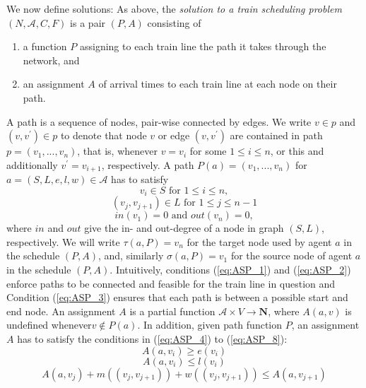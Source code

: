 \documentclass{article}
\begin{document}
We now define solutions:
As above, the \emph{solution to a train scheduling problem} $(N, \mathcal{A}, C, F)$ is a pair $(P,A)$ consisting of
\begin{enumerate}
    \item a function $P$ assigning to each train line the path it takes through the network, and
    \item an assignment $A$ of arrival times to each train line at each node on their path.
\end{enumerate}
A path is a sequence of nodes, pair-wise connected by edges. We write $v\in p$ and $(v, v^\prime)\in p$ to denote that node $v$ or edge $(v, v^\prime)$ are contained in path $p=(v_1, . . . , v_n)$, that is, whenever $v=v_i$ for some $1\leq i \leq n$, or this and additionally $v^\prime=v_{i+1}$, respectively.
%
A path $P(a) = (v_1, . . . , v_n)$ for $a= (S, L, e, l, w)\in \mathcal{A}$ has to satisfy
\begin{equation}
v_i \in S \textrm{ for }1\leq i \leq n \label{eq:ASP_1},
\end{equation}
\begin{equation}
(v_j, v_{j+1})\in L \textrm{ for } 1\leq j \leq n-1 \label{eq:ASP_2}
\end{equation}
\begin{equation}
in(v_1) = 0 \textrm{ and } out(v_n) = 0,\label{eq:ASP_3}
\end{equation}
where $in$ and $out$ give the in- and out-degree of a node in graph $(S, L)$, respectively.
We will write $\tau(a,P)=v_n$ for the target node used by agent $a$ in the schedule $(P,A)$, and, similarly $\sigma(a,P)=v_1$ for the source node of agent $a$ in the schedule $(P,A)$.
Intuitively, conditions (\ref{eq:ASP_1}) and (\ref{eq:ASP_2}) enforce paths to be connected and feasible for the train line in question and Condition (\ref{eq:ASP_3}) ensures that each path is between a possible start and end node.
An assignment $A$ is a partial function $\mathcal{A}\times V\to \mathbf{N}$, where $A(a, v)$ is undefined whenever$v\not\in P(a)$. In addition, given path function $P$, an assignment $A$ has to satisfy the conditions in (\ref{eq:ASP_4}) to (\ref{eq:ASP_8}):
\begin{equation}
A(a, v_i)\geq e(v_i)\label{eq:ASP_4}
\end{equation}
\begin{equation}
A(a, v_i)\leq l(v_i)\label{eq:ASP_5}
\end{equation}
\begin{equation}
A(a, v_j) +m((v_j, v_{j+1})) +w((v_j, v_{j+1}))\leq A(a, v_{j+1})\label{eq:ASP_6}
\end{equation}
\end{document}
